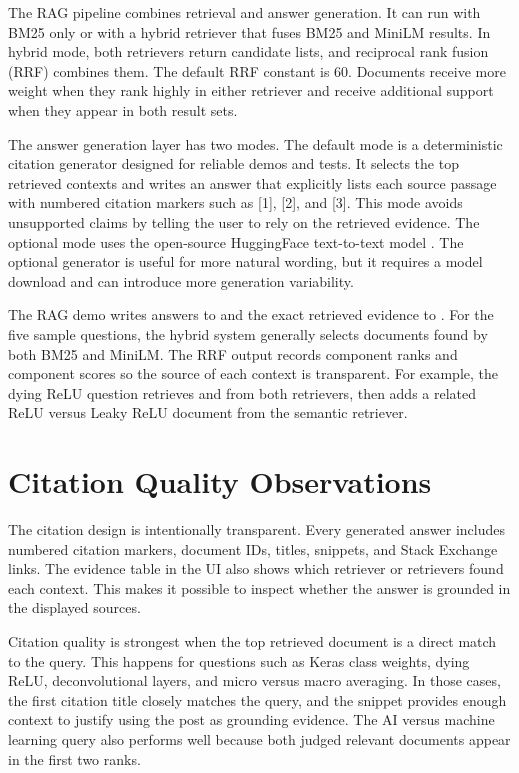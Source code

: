 \documentclass[11pt]{article}
\begin{document}
The RAG pipeline combines retrieval and answer generation. It can run with BM25 only or with a hybrid retriever that fuses BM25 and MiniLM results. In hybrid mode, both retrievers return candidate lists, and reciprocal rank fusion (RRF) combines them. The default RRF constant is 60. Documents receive more weight when they rank highly in either retriever and receive additional support when they appear in both result sets.

The answer generation layer has two modes. The default mode is a deterministic citation generator designed for reliable demos and tests. It selects the top retrieved contexts and writes an answer that explicitly lists each source passage with numbered citation markers such as [1], [2], and [3]. This mode avoids unsupported claims by telling the user to rely on the retrieved evidence. The optional mode uses the open-source HuggingFace text-to-text model . The optional generator is useful for more natural wording, but it requires a model download and can introduce more generation variability.

The RAG demo writes answers to  and the exact retrieved evidence to . For the five sample questions, the hybrid system generally selects documents found by both BM25 and MiniLM. The RRF output records component ranks and component scores so the source of each context is transparent. For example, the dying ReLU question retrieves  and  from both retrievers, then adds a related ReLU versus Leaky ReLU document from the semantic retriever.

\section{Citation Quality Observations}

The citation design is intentionally transparent. Every generated answer includes numbered citation markers, document IDs, titles, snippets, and Stack Exchange links. The evidence table in the UI also shows which retriever or retrievers found each context. This makes it possible to inspect whether the answer is grounded in the displayed sources.

Citation quality is strongest when the top retrieved document is a direct match to the query. This happens for questions such as Keras class weights, dying ReLU, deconvolutional layers, and micro versus macro averaging. In those cases, the first citation title closely matches the query, and the snippet provides enough context to justify using the post as grounding evidence. The AI versus machine learning query also performs well because both judged relevant documents appear in the first two ranks.
\end{document}
